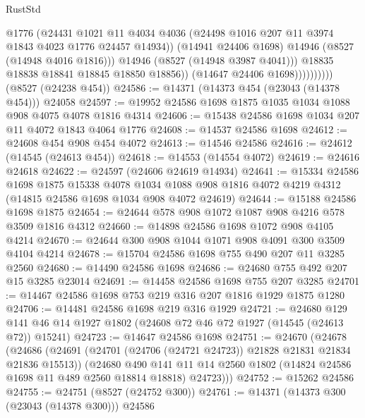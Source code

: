 \begin{lexlean}{RustStd}
\begin{coremodule}
                              @1776
                              (@24431
                                @1021
                                @11
                                @4034
                                @4036
                                (@24498 @1016 @207 @11 @3974 @1843 @4023 @1776 @24457 @14934))
                              (@14941 @24406 @1698)
                              @14946
                              (@8527 (@14948 @4016 @1816)))
                            @14946
                            (@8527 (@14948 @3987 @4041)))
                          @18835
                          @18838
                          @18841
                          @18845
                          @18850
                          @18856))
                      (@14647 @24406 @1698))))))))))
    (@8527 (@24238 @454))
@24586 := @14371 (@14373 @454 (@23043 (@14378 @454))) @24058
@24597 := @19952 @24586 @1698 @1875 @1035 @1034 @1088 @908 @4075 @4078 @1816 @4314
@24606 := @15438 @24586 @1698 @1034 @207 @11 @4072 @1843 @4064 @1776
@24608 := @14537 @24586 @1698
@24612 := @24608 @454 @908 @454 @4072
@24613 := @14546 @24586
@24616 := @24612 (@14545 (@24613 @454))
@24618 := @14553 (@14554 @4072)
@24619 := @24616 @24618
@24622 := @24597 (@24606 @24619 @14934)
@24641 := @15334
    @24586
    @1698
    @1875
    @15338
    @4078
    @1034
    @1088
    @908
    @1816
    @4072
    @4219
    @4312
    (@14815 @24586 @1698 @1034 @908 @4072 @24619)
@24644 := @15188 @24586 @1698 @1875
@24654 := @24644 @578 @908 @1072 @1087 @908 @4216 @578 @3509 @1816 @4312
@24660 := @14898 @24586 @1698 @1072 @908 @4105 @4214
@24670 := @24644 @300 @908 @1044 @1071 @908 @4091 @300 @3509 @4104 @4214
@24678 := @15704 @24586 @1698 @755 @490 @207 @11 @3285 @2560
@24680 := @14490 @24586 @1698
@24686 := @24680 @755 @492 @207 @15 @3285 @23014
@24691 := @14458 @24586 @1698 @755 @207 @3285
@24701 := @14467 @24586 @1698 @753 @219 @316 @207 @1816 @1929 @1875 @1280
@24706 := @14481 @24586 @1698 @219 @316 @1929
@24721 := @24680
    @129
    @141
    @46
    @14
    @1927
    @1802
    (@24608 @72 @46 @72 @1927 (@14545 (@24613 @72)) @15241)
@24723 := @14647 @24586 @1698
@24751 := @24670
    (@24678
      (@24686
        (@24691 (@24701 (@24706 (@24721 @24723)) @21828 @21831 @21834 @21836 @15513))
        (@24680
          @490
          @141
          @11
          @14
          @2560
          @1802
          (@14824 @24586 @1698 @11 @489 @2560 @18814 @18818)
          @24723)))
@24752 := @15262 @24586
@24755 := @24751 (@8527 (@24752 @300))
@24761 := @14371 (@14373 @300 (@23043 (@14378 @300))) @24586

\end{coremodule}
\end{lexlean}
